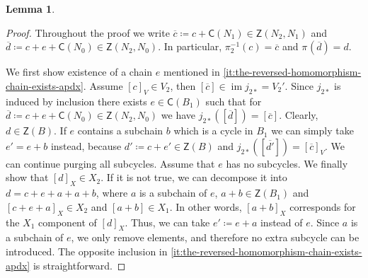 \documentclass[letterpaper,11pt]{article}
\theoremstyle{plain}
\newtheorem{lemma}[theorem]{Lemma}
\theoremstyle{definition}
\newcommand{\im}{\operatorname{im}}
\newcounter{li}
\newcommand{\Zgroup}{\mathsf{Z}}
\newcommand{\Cgroup}{\mathsf{C}}
\newcommand{\imapx}[1]{j_{#1\ast}}
\newcommand{\projmap}[1]{\pi_{#1}}
\begin{document}
{\begin{lemma}
\begin{enumerate}[label=\arabic*)]
    \end{enumerate}
\end{lemma}

\begin{proof}
    Throughout the proof we write $\overline{c}\coloneqq c+\Cgroup(N_1)\in\Zgroup(N_2,N_1)$ and $\overline{d}\coloneqq c+e+\Cgroup(N_0)\in\Zgroup(N_2,N_0)$.
    In particular, $\projmap{2}^{-1}(c) = \overline{c}$ and $\projmap{}(\overline{d})=d$.

    We first show existence of a chain $e$ mentioned in \ref{it:the-reversed-homomorphism-chain-exists-apdx}.
    Assume $[c]_V\in V_2$, then $[\overline{c}]\in\im\imapx{2}=V_2'$.
    Since $\imapx{2}$ is induced by inclusion there exists $e\in\Cgroup(B_1)$ such that for
        $\overline{d}\coloneqq c+e + \Cgroup(N_0)\in\Zgroup(N_2,N_0)$ we have $\imapx{2}([\overline{d}])=[\overline{c}]$.
    Clearly, $d\in\Zgroup(B)$.
    If $e$ contains a subchain $b$ which is a cycle in $B_1$ we can simply take $e'=e+b$ instead, because $d'\coloneqq c+e'\in\Zgroup(B)$ and $\imapx{2}([\overline{d'}])=[\overline{c}]_V$.
    We can continue purging all subcycles. 
    Assume that $e$ has no subcycles.
    We finally show that $[d]_X\in X_2$.
    If it is not true, we can decompose it into $d=c+e+a+a+b$, where $a$ is a subchain of $e$, $a+b\in\Zgroup(B_1)$ and $[c+e+a]_X\in X_2$ and $[a+b]\in X_1$.
    In other words, $[a+b]_X$ corresponds for the $X_1$ component of $[d]_X$.
    Thus, we can take $e'\coloneqq e+a$ instead of $e$. 
    Since $a$ is a subchain of $e$, we only remove elements, and therefore no extra subcycle can be introduced. 
    The opposite inclusion in \ref{it:the-reversed-homomorphism-chain-exists-apdx} is straightforward.


\end{proof}}
\end{document}
